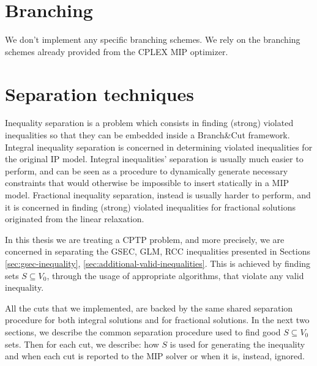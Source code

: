 \section{Branching}
\label{sec:impl-branching}

We don't implement any specific branching schemes.
We rely on the branching schemes already provided from the CPLEX MIP optimizer.

\section{Separation techniques}
\label{sec:impl-separation-techniques}

Inequality separation is a problem which consists in finding (strong) violated inequalities so that they can be embedded inside a Branch\&Cut framework.
Integral inequality separation is concerned in determining violated inequalities for the original IP model.
Integral inequalities' separation is usually much easier to perform, and can be seen as a procedure to dynamically generate necessary constraints that would otherwise be impossible to insert statically in a MIP model.
Fractional inequality separation, instead is usually harder to perform, and it is concerned in finding (strong) violated inequalities for fractional solutions originated from the linear relaxation.

In this thesis we are treating a CPTP problem, and more precisely, we are concerned in separating the GSEC, GLM, RCC inequalities presented in Sections \ref{sec:gsec-inequality}, \ref{sec:additional-valid-inequalities}.
This is achieved by finding sets $S \subseteq V_0$, through the usage of appropriate algorithms, that violate any valid inequality.

All the cuts that we implemented, are backed by the same shared separation procedure for both integral solutions and for fractional solutions.
In the next two sections, we describe the common separation procedure used to find good $S \subseteq V_0$ sets.
Then for each cut, we describe: how $S$ is used for generating the inequality and when each cut is reported to the MIP solver or when it is, instead, ignored.

